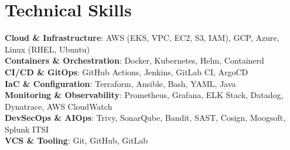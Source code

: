 \documentclass[letterpaper,11pt]{article}
\begin{document}
\section{Technical Skills}
 \begin{itemize}[leftmargin=0.15in, label={}]
    \small{\item{
     \textbf{Cloud \& Infrastructure}{: AWS (EKS, VPC, EC2, S3, IAM), GCP, Azure, Linux (RHEL, Ubuntu)} \\
     \textbf{Containers \& Orchestration}{: Docker, Kubernetes, Helm, Containerd} \\
     \textbf{CI/CD \& GitOps}{: GitHub Actions, Jenkins, GitLab CI, ArgoCD} \\
     \textbf{IaC \& Configuration}{: Terraform, Ansible, Bash, YAML, Java} \\
     \textbf{Monitoring \& Observability}{: Prometheus, Grafana, ELK Stack, Datadog, Dynatrace, AWS CloudWatch} \\
     \textbf{DevSecOps \& AIOps}{: Trivy, SonarQube, Bandit, SAST, Cosign, Moogsoft, Splunk ITSI} \\
     \textbf{VCS \& Tooling}{: Git, GitHub, GitLab}
    }}
 \end{itemize}

\end{document}
